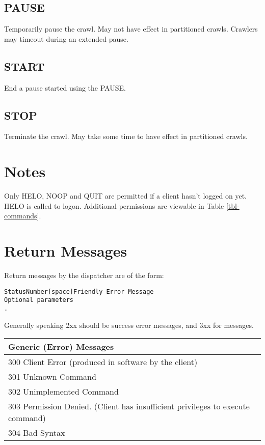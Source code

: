 \subsection{PAUSE}
Temporarily pause the crawl. May not have effect in partitioned crawls. Crawlers may timeout during an extended pause.
\subsection{START}
End a pause started using the PAUSE.
\subsection{STOP}
Terminate the crawl. May take some time to have effect in partitioned crawls.

\section{Notes}
Only HELO, NOOP and QUIT are permitted if a client hasn't logged on yet. HELO is called to logon. Additional permissions are viewable in Table \ref{tbl-commands}.

\section{Return Messages}
Return messages by the dispatcher are of the form:
\begin{verbatim}
StatusNumber[space]Friendly Error Message
Optional parameters
.
\end{verbatim}
Generally speaking 2xx should be success error messages, and 3xx for messages.\\
\begin{center}
\begin{tabular}{|l|}
\hline
\bf{Generic (Error) Messages}\\
\hline
300 Client Error (produced in software by the client)\\
301 Unknown Command\\
302 Unimplemented Command\\
303 Permission Denied. (Client has insufficient privileges to execute command)\\
304 Bad Syntax\\
\hline
\end{tabular}
\end{center}
